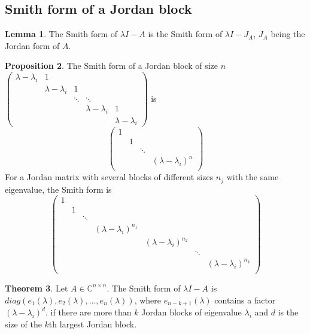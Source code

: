 \documentclass[12pt, openany]{report}
\theoremstyle{definition}
\newtheorem{thm}{Theorem}[chapter]
\newtheorem{lem}[thm]{Lemma}
\newtheorem{proposition}[thm]{Proposition}
\newcommand{\C}{\mathbb{C}}
\begin{document}
\subsection{Smith form of a Jordan block}
\begin{lem}
    The Smith form of $\lambda I-A$ is the Smith form of $\lambda I-J_A$, $J_A$ being the Jordan form of $A$. 
\end{lem}
\begin{proposition}
    The Smith form of a Jordan block of size $n$ $\begin{pmatrix}
        \lambda-\lambda_i & 1 & & & \\
        & \lambda-\lambda_i & 1 & & \\
        &&\ddots&\ddots&\\
        &&&\lambda-\lambda_i & 1\\
        &&&&\lambda-\lambda_i
    \end{pmatrix}$ is \begin{equation}
        \begin{pmatrix}
            1& \\
            & 1 & \\
             & & \ddots & \\
            & & & (\lambda-\lambda_i)^n\\
        \end{pmatrix}
    \end{equation}
    For a Jordan matrix with several blocks of different sizes $n_j$ with the same eigenvalue, the Smith form is 
    \begin{equation}
        \begin{pmatrix}
            1 & \\
            & 1 &\\
            && \ddots & \\
            & & & (\lambda-\lambda_i)^{n_1}\\
            & & & & (\lambda-\lambda_i)^{n_2}\\
            & & & & & \ddots \\
            & & & & & & (\lambda-\lambda_i)^{n_k}\\
        \end{pmatrix}
    \end{equation}
\end{proposition}
\begin{thm}
    Let $A\in \C^{n\times n}$. The Smith form of $\lambda I-A$ is $diag(e_1(\lambda),e_2(\lambda),\dots, e_n(\lambda))$, where $e_{n-k+1}(\lambda)$ contains a factor $(\lambda-\lambda_i)^d$. if there are more than $k$ Jordan blocks of eigenvalue $\lambda_i$ and $d$ is the size of the $k$th largest Jordan block.
\end{thm}
\end{document}

